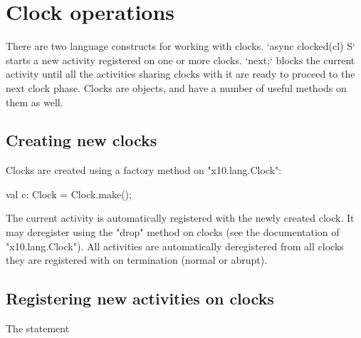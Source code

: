 \section{Clock operations}\label{sec:clock}
There are two language constructs for working with clocks. 
\xcd`async clocked(cl) S` starts a new activity registered on one or more
clocks.  \xcd`next;` blocks the current activity until all the activities
sharing clocks with it are ready to proceed to the next clock phase. 
Clocks are objects, and have a number of useful methods on them as well.

\subsection{Creating new clocks}\label{sec:clock:create}

Clocks are created using a factory method on \xcd"x10.lang.Clock":


\begin{xten}
val c: Clock = Clock.make();
\end{xten}


The current activity is automatically registered with the newly
created clock.  It may deregister using the \xcd"drop" method on
clocks (see the documentation of \xcd"x10.lang.Clock"). All activities
are automatically deregistered from all clocks they are registered
with on termination (normal or abrupt).

\subsection{Registering new activities on clocks}
\label{sec:clock:register}

The statement 

